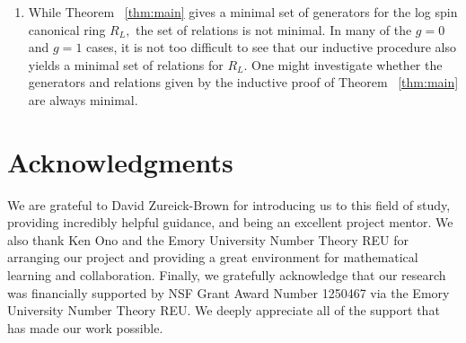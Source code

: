 \documentclass{amsart}
\theoremstyle{plain}
\newtheorem{question}[thm]{Question}
\theoremstyle{definition}
\theoremstyle{remark}
\numberwithin{equation}{section}
\newcommand \sx{\mathscr X}
\newcommand \di{\text{Div }}
\begin{document}
\begin{enumerate}
Suppose the generators and relations of $R_{L_X}$ are known, where $(\sx, \Delta, L)$ is a spin canonical ring, $X$ is the coarse space of $\sx$, and $L_X \leq L$ is a half canonical divisor of $X$. In this case our proof of Theorem ~\ref{thm:main} yields an algorithm for determining the generators of $L$. This raises the following Petri-like question:
\begin{question}
\label{ques:half-canonical-petri}
Given a {\rm(}non-stacky {\rm)} curve $X$ and a half canonical divisor $L \in \di X$, can one write down a set of minimal generators and minimal relations for $R_L$? If so, can one give the generic ideal of $R_L$ or the generic initial ideal of $R_L$, as defined in Voight and Zureick Brown \cite[Definition 2.2.7]{vzb:stacky}?
\end{question}
In particular, if Question ~\ref{ques:half-canonical-petri} were answered affirmatively one would be able to write down explicit generators and relations for $R_L$ on a stacky curve, essentially by inductively applying Lemma ~\ref{lem:raise-stacky-order}.
	\item While Theorem ~\ref{thm:main} gives a minimal set of generators for the log spin canonical ring $R_L,$ the set of relations is not minimal. In many of the $g = 0$ and $g=1$ cases, it is not too difficult to see that our inductive procedure also yields a minimal set of relations for $R_L$. One might investigate whether the generators and relations given by the inductive proof of Theorem ~\ref{thm:main} are always minimal.
	\end{enumerate}


\section{Acknowledgments}
We are grateful to David Zureick-Brown for introducing us to this
field of study, providing incredibly helpful guidance, and being an
excellent project mentor. We also thank Ken Ono and the Emory University
Number Theory REU for arranging our project and providing a great
environment for mathematical learning and collaboration. Finally, we
gratefully acknowledge that our research was financially supported by
NSF Grant Award Number 1250467 via the Emory University Number Theory REU.
We deeply appreciate all of the support that has made our work possible.


\nocite{*}
{}

\end{document}
